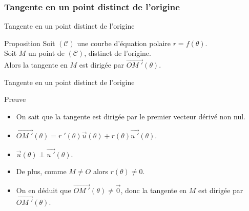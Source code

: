 \documentclass[14pt]{beamer}
\begin{document}
\subsubsection{Tangente en un point distinct de l'origine}
\begin{frame}{Tangente en un point distinct de l'origine}
        \begin{alertblock}{Proposition}
                Soit $(\mathcal{C})$ une courbe d'équation polaire $r=f(\theta)$.\\
                Soit $M$ un point de $(\mathcal{C})$, distinct de l'origine.\\
                Alors la tangente en $M$ est dirigée par $\vec{OM\;'}(\theta)$.
        \end{alertblock}
\end{frame}
\begin{frame}{Tangente en un point distinct de l'origine}
        \begin{block}{Preuve}
                \begin{itemize}
                                \item<1-> On sait que la tangente est dirigée par le premier
                                        vecteur dérivé non nul.\\
                                \item<2-> $\vec{OM\;'}(\theta) = r\;'(\theta)\vec{u}(\theta)
                                        +r(\theta)\vec{u\;'}(\theta)$.
                                \item<3-> $\vec{u}(\theta)\perp\vec{u\;'}(\theta)$.\\
                                \item<4-> De plus, comme $M\ne O$ alors $r(\theta)\ne 0$.
                                \item<5-> On en déduit que $\vec{OM\;'}(\theta)\ne\vec{0}$, donc
                                        la tangente en $M$ est dirigée par $\vec{OM\;'}(\theta)$.


\end{itemize}
\end{block}
\end{frame}
\end{document}
